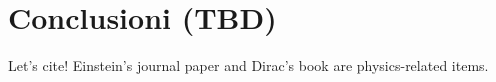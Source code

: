 \documentclass[12pt,a4paper,twoside]{report}
\begin{document}
	
	
	


	
	
	
	
			
	\chapter*{Conclusioni (TBD)}
		Let's cite! Einstein's journal paper \cite{einstein} and Dirac's book \cite{dirac} are physics-related items.
	\newpage	
	\printbibliography[
		heading=bibintoc,
		title={Bibliografia}
		]
		 	
\end{document}
